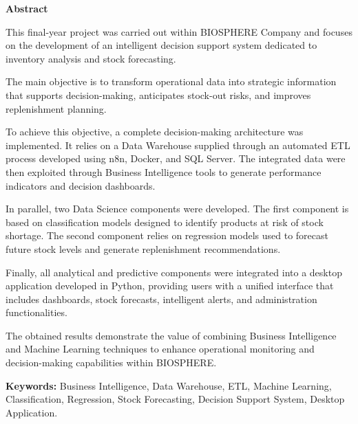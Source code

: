 \begin{singlespace}
\vspace{0.5cm} 

{}
\begin{center}
    \Large\bfseries Abstract
\end{center}
\vspace{0.1cm}

This final-year project was carried out within BIOSPHERE Company and focuses on the development of an intelligent decision support system dedicated to inventory analysis and stock forecasting.

The main objective is to transform operational data into strategic information that supports decision-making, anticipates stock-out risks, and improves replenishment planning.

To achieve this objective, a complete decision-making architecture was implemented. It relies on a Data Warehouse supplied through an automated ETL process developed using n8n, Docker, and SQL Server. The integrated data were then exploited through Business Intelligence tools to generate performance indicators and decision dashboards.

In parallel, two Data Science components were developed. The first component is based on classification models designed to identify products at risk of stock shortage. The second component relies on regression models used to forecast future stock levels and generate replenishment recommendations.

Finally, all analytical and predictive components were integrated into a desktop application developed in Python, providing users with a unified interface that includes dashboards, stock forecasts, intelligent alerts, and administration functionalities.

The obtained results demonstrate the value of combining Business Intelligence and Machine Learning techniques to enhance operational monitoring and decision-making capabilities within BIOSPHERE.

\vspace{0.2cm}
\noindent\textbf{Keywords:} Business Intelligence, Data Warehouse, ETL, Machine Learning, Classification, Regression, Stock Forecasting, Decision Support System, Desktop Application.

\end{singlespace}